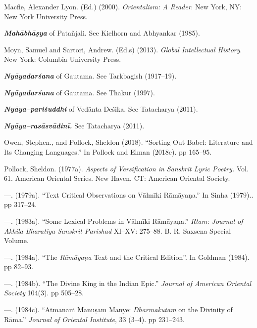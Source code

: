  \item Macfie, Alexander Lyon. (Ed.) (2000).\textit{ Orientalism: A Reader}. New York, NY: New York University Press.

 \item \textit{\textbf{Mahābhāṣya}} of Patañjali. See Kielhorn and Abhyankar (1985).

 \item Moyn, Samuel and Sartori, Andrew. (Ed.s) (2013).\textit{ Global Intellectual History}. New York: Columbia University Press.

 \item \textit{\textbf{Nyāyadarśana}} of Gautama. See Tarkbagish (1917–19).

 \item \textit{\textbf{Nyāyadarśana}} of Gautama. See Thakur (1997).

 \item \textit{\textbf{Nyāya–pariśuddhi}} of Vedānta Deśika. See Tatacharya (2011).

 \item \textit{\textbf{Nyāya–rasāsvādinī.}} See Tatacharya (2011).

 \item Owen, Stephen., and Pollock, Sheldon (2018). “Sorting Out Babel: Literature and Its Changing Languages.” In Pollock and Elman (2018e). pp 165–95.

 \item Pollock, Sheldon. (1977a). \textit{Aspects of Versification in Sanskrit Lyric Poetry.} Vol. 61. American Oriental Series. New Haven, CT: American Oriental Society.

 \item —. (1979a). “Text Critical Observations on Vālmīki Rāmāyaṇa.” In Sinha (1979).. pp 317–24.

 \item —. (1983a). “Some Lexical Problems in Vālmīki Rāmāyaṇa.” \textit{Rtam: Journal of Akhila Bharatiya Sanskrit Parishad} XI–XV: 275–88. B. R. Saxsena Special Volume. 

 \item —. (1984a). “The \textit{Rāmāyaṇa} Text and the Critical Edition”. In Goldman (1984). pp 82–93.

 \item —. (1984b). “The Divine King in the Indian Epic.” \textit{Journal of American Oriental Society} 104(3). pp 505–28.

 \item —. (1984c). “Ātmānaṁ Mānuṣam Manye: \textit{Dharmākūtam} on the Divinity of Rāma.” \textit{Journal of Oriental Institute}, 33 (3–4). pp 231–243.

